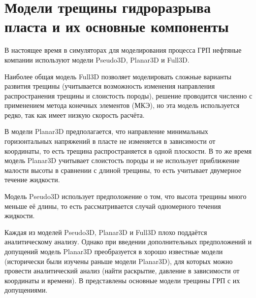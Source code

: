 \chapter{Модели трещины гидроразрыва пласта и их основные компоненты} \label{ch2}

В настоящее время в симуляторах для моделирования процесса ГРП нефтяные компании используют модели Pseudo3D, Planar3D и Full3D.

Наиболее общая модель Full3D позволяет моделировать сложные варианты развития трещины (учитывается возможность изменения направления распространения трещины и слоистость породы), решение проводится численно с применением метода конечных элементов (МКЭ), но эта модель используется редко, так как имеет низкую скорость расчёта.

В модели Planar3D предполагается, что направление минимальных горизонтальных напряжений в пласте не изменяется в зависимости от координаты, то есть трещина распространяется в одной плоскости.
В то же время модель Planar3D учитывает слоистость породы и не использует приближение малости высоты в сравнении с длиной трещины, то есть учитывает двумерное течение жидкости.

Модель Pseudo3D использует предположение о том, что высота трещины много меньше её длины, то есть рассматривается случай одномерного течения жидкости.

Каждая из моделей Pseudo3D, Planar3D и Full3D плохо поддаётся аналитическому анализу.
Однако при введении дополнительных предположений и допущений модель Planar3D преобразуется в хорошо известные модели (исторически были изучены раньше модели Planar3D), для которых можно провести аналитический анализ (найти раскрытие, давление в зависимости от координаты и времени).
В  представлены основные модели трещины ГРП с их допущениями.


